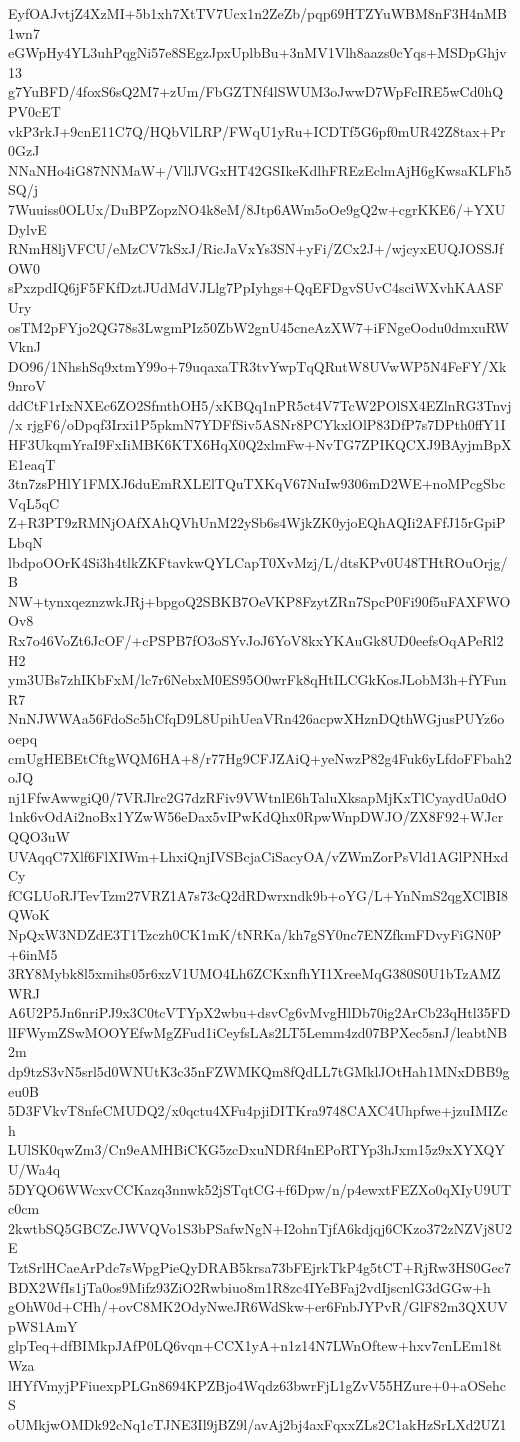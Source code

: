 EyfOAJvtjZ4XzMI+5b1xh7XtTV7Ucx1n2ZeZb/pqp69HTZYuWBM8nF3H4nMB1wn7
eGWpHy4YL3uhPqgNi57e8SEgzJpxUplbBu+3nMV1Vlh8aazs0cYqs+MSDpGhjv13
g7YuBFD/4foxS6sQ2M7+zUm/FbGZTNf4lSWUM3oJwwD7WpFcIRE5wCd0hQPV0cET
vkP3rkJ+9cnE11C7Q/HQbVlLRP/FWqU1yRu+ICDTf5G6pf0mUR42Z8tax+Pr0GzJ
NNaNHo4iG87NNMaW+/VllJVGxHT42GSIkeKdlhFREzEclmAjH6gKwsaKLFh5SQ/j
7Wuuiss0OLUx/DuBPZopzNO4k8eM/8Jtp6AWm5oOe9gQ2w+cgrKKE6/+YXUDylvE
RNmH8ljVFCU/eMzCV7kSxJ/RicJaVxYs3SN+yFi/ZCx2J+/wjcyxEUQJOSSJfOW0
sPxzpdIQ6jF5FKfDztJUdMdVJLlg7PpIyhgs+QqEFDgvSUvC4sciWXvhKAASFUry
osTM2pFYjo2QG78s3LwgmPIz50ZbW2gnU45cneAzXW7+iFNgeOodu0dmxuRWVknJ
DO96/1NhshSq9xtmY99o+79uqaxaTR3tvYwpTqQRutW8UVwWP5N4FeFY/Xk9nroV
ddCtF1rIxNXEc6ZO2SfmthOH5/xKBQq1nPR5ct4V7TcW2POlSX4EZlnRG3Tnvj/x
rjgF6/oDpqf3Irxi1P5pkmN7YDFfSiv5ASNr8PCYkxlOlP83DfP7s7DPth0ffY1I
HF3UkqmYraI9FxIiMBK6KTX6HqX0Q2xlmFw+NvTG7ZPIKQCXJ9BAyjmBpXE1eaqT
3tn7zsPHlY1FMXJ6duEmRXLElTQuTXKqV67NuIw9306mD2WE+noMPcgSbcVqL5qC
Z+R3PT9zRMNjOAfXAhQVhUnM22ySb6s4WjkZK0yjoEQhAQIi2AFfJ15rGpiPLbqN
lbdpoOOrK4Si3h4tlkZKFtavkwQYLCapT0XvMzj/L/dtsKPv0U48THtROuOrjg/B
NW+tynxqeznzwkJRj+bpgoQ2SBKB7OeVKP8FzytZRn7SpcP0Fi90f5uFAXFWOOv8
Rx7o46VoZt6JcOF/+cPSPB7fO3oSYvJoJ6YoV8kxYKAuGk8UD0eefsOqAPeRl2H2
ym3UBs7zhIKbFxM/lc7r6NebxM0ES95O0wrFk8qHtILCGkKosJLobM3h+fYFunR7
NnNJWWAa56FdoSc5hCfqD9L8UpihUeaVRn426acpwXHznDQthWGjusPUYz6ooepq
cmUgHEBEtCftgWQM6HA+8/r77Hg9CFJZAiQ+yeNwzP82g4Fuk6yLfdoFFbah2oJQ
nj1FfwAwwgiQ0/7VRJlrc2G7dzRFiv9VWtnlE6hTaluXksapMjKxTlCyaydUa0dO
1nk6vOdAi2noBx1YZwW56eDax5vIPwKdQhx0RpwWnpDWJO/ZX8F92+WJcrQQO3uW
UVAqqC7Xlf6FlXIWm+LhxiQnjIVSBcjaCiSacyOA/vZWmZorPsVld1AGlPNHxdCy
fCGLUoRJTevTzm27VRZ1A7s73cQ2dRDwrxndk9b+oYG/L+YnNmS2qgXClBI8QWoK
NpQxW3NDZdE3T1Tzczh0CK1mK/tNRKa/kh7gSY0nc7ENZfkmFDvyFiGN0P+6inM5
3RY8Mybk8l5xmihs05r6xzV1UMO4Lh6ZCKxnfhYI1XreeMqG380S0U1bTzAMZWRJ
A6U2P5Jn6nriPJ9x3C0tcVTYpX2wbu+dsvCg6vMvgHlDb70ig2ArCb23qHtl35FD
lIFWymZSwMOOYEfwMgZFud1iCeyfsLAs2LT5Lemm4zd07BPXec5snJ/leabtNB2m
dp9tzS3vN5srl5d0WNUtK3c35nFZWMKQm8fQdLL7tGMklJOtHah1MNxDBB9geu0B
5D3FVkvT8nfeCMUDQ2/x0qctu4XFu4pjiDITKra9748CAXC4Uhpfwe+jzuIMIZch
LUlSK0qwZm3/Cn9eAMHBiCKG5zcDxuNDRf4nEPoRTYp3hJxm15z9xXYXQYU/Wa4q
5DYQO6WWcxvCCKazq3nnwk52jSTqtCG+f6Dpw/n/p4ewxtFEZXo0qXIyU9UTc0cm
2kwtbSQ5GBCZcJWVQVo1S3bPSafwNgN+I2ohnTjfA6kdjqj6CKzo372zNZVj8U2E
TztSrlHCaeArPdc7sWpgPieQyDRAB5krsa73bFEjrkTkP4g5tCT+RjRw3HS0Gec7
BDX2WfIs1jTa0os9Mifz93ZiO2Rwbiuo8m1R8zc4IYeBFaj2vdIjscnlG3dGGw+h
gOhW0d+CHh/+ovC8MK2OdyNweJR6WdSkw+er6FnbJYPvR/GlF82m3QXUVpWS1AmY
glpTeq+dfBIMkpJAfP0LQ6vqn+CCX1yA+n1z14N7LWnOftew+hxv7cnLEm18tWza
lHYfVmyjPFiuexpPLGn8694KPZBjo4Wqdz63bwrFjL1gZvV55HZure+0+aOSehcS
oUMkjwOMDk92cNq1cTJNE3Il9jBZ9l/avAj2bj4axFqxxZLs2C1akHzSrLXd2UZ1
